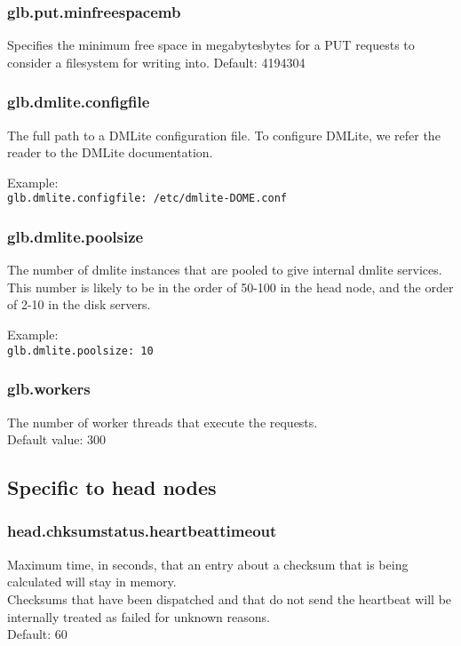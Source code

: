 \documentclass[a4paper,10pt]{scrreprt}
\begin{document}
\subsubsection{glb.put.minfreespacemb}
Specifies the minimum free space in megabytesbytes for a PUT requests to consider a filesystem for writing into.
Default: 4194304

\subsubsection{glb.dmlite.configfile}
 

The full path to a DMLite configuration file. To configure DMLite, we refer the reader to the DMLite documentation.

 Example:\\
\lstinline"glb.dmlite.configfile: /etc/dmlite-DOME.conf"\\


\subsubsection{glb.dmlite.poolsize}

The number of dmlite instances that are pooled to give internal dmlite services. This number is likely to be in the order of 50-100 in the head node, and the order of 2-10 in the disk servers.

 Example:\\
\lstinline"glb.dmlite.poolsize: 10"\\

\subsubsection{glb.workers}

The number of worker threads that execute the requests.\\
Default value: 300\\




\subsection{Specific to head nodes}

\subsubsection{head.chksumstatus.heartbeattimeout}
Maximum time, in seconds, that an entry about a checksum that is being calculated will stay in memory.\\
Checksums that have been dispatched and that do not send the heartbeat will be internally treated as failed for unknown reasons.\\
Default: 60\\
\end{document}

